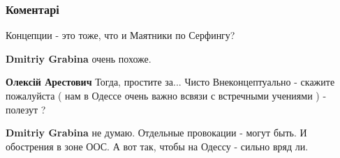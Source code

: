  
 
 
 
 
\subsubsection{Коментарі}

\begin{itemize}
 
Концепции - это тоже, что и Маятники по Серфингу?

\begin{itemize}
 
\textbf{Dmitriy Grabina} очень похоже.

 
\textbf{Олексій Арестович}
Тогда, простите за... Чисто Внеконцептуально - скажите пожалуйста ( нам в
Одессе очень важно всвязи с встречными учениями ) - полезут ?



 
\textbf{Dmitriy Grabina} не думаю. Отдельные провокации - могут быть.
И обострения в зоне ООС.
А вот так, чтобы на Одессу - сильно вряд ли.


\end{itemize}
\end{itemize}
